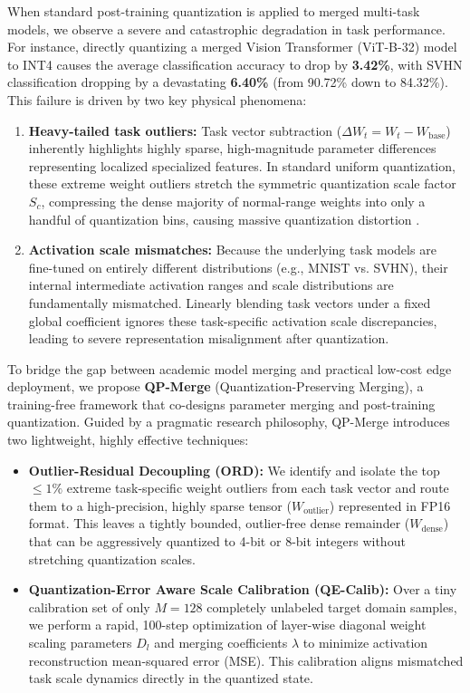 When standard post-training quantization is applied to merged multi-task models, we observe a severe and catastrophic degradation in task performance. For instance, directly quantizing a merged Vision Transformer (ViT-B-32) model to INT4 causes the average classification accuracy to drop by \textbf{3.42\%}, with SVHN classification dropping by a devastating \textbf{6.40\%} (from 90.72\% down to 84.32\%). This failure is driven by two key physical phenomena:
\begin{enumerate}
    \item \textbf{Heavy-tailed task outliers:} Task vector subtraction ($\Delta W_t = W_t - W_{\text{base}}$) inherently highlights highly sparse, high-magnitude parameter differences representing localized specialized features. In standard uniform quantization, these extreme weight outliers stretch the symmetric quantization scale factor $S_c$, compressing the dense majority of normal-range weights into only a handful of quantization bins, causing massive quantization distortion \cite{squeezellm2023}.
    \item \textbf{Activation scale mismatches:} Because the underlying task models are fine-tuned on entirely different distributions (e.g., MNIST vs. SVHN), their internal intermediate activation ranges and scale distributions are fundamentally mismatched. Linearly blending task vectors under a fixed global coefficient ignores these task-specific activation scale discrepancies, leading to severe representation misalignment after quantization.
\end{enumerate}

To bridge the gap between academic model merging and practical low-cost edge deployment, we propose \textbf{QP-Merge} (Quantization-Preserving Merging), a training-free framework that co-designs parameter merging and post-training quantization. Guided by a pragmatic research philosophy, QP-Merge introduces two lightweight, highly effective techniques:
\begin{itemize}
    \item \textbf{Outlier-Residual Decoupling (ORD):} We identify and isolate the top $\le 1\%$ extreme task-specific weight outliers from each task vector and route them to a high-precision, highly sparse tensor ($W_{\text{outlier}}$) represented in FP16 format. This leaves a tightly bounded, outlier-free dense remainder ($W_{\text{dense}}$) that can be aggressively quantized to 4-bit or 8-bit integers without stretching quantization scales.
    \item \textbf{Quantization-Error Aware Scale Calibration (QE-Calib):} Over a tiny calibration set of only $M=128$ completely unlabeled target domain samples, we perform a rapid, 100-step optimization of layer-wise diagonal weight scaling parameters $D_l$ and merging coefficients $\lambda$ to minimize activation reconstruction mean-squared error (MSE). This calibration aligns mismatched task scale dynamics directly in the quantized state.
\end{itemize}

